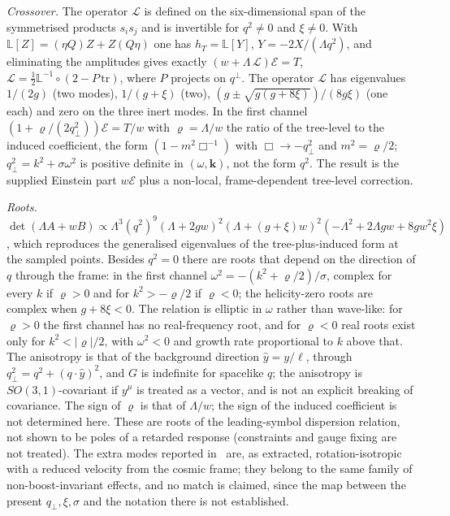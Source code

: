 \emph{Crossover.} The operator \(\mathcal L\) is defined on the six-dimensional span of the symmetrised products \(s_is_j\) and is invertible for \(q^2\neq0\) and \(\xi\neq0\). With \(\mathbb L[Z]=(\eta Q)Z+Z(Q\eta)\) one has \(h_T=\mathbb L[Y]\), \(Y=-2X/(\Lambda q^2)\), and eliminating the amplitudes gives exactly \((w+\Lambda\,\mathcal L)\mathcal E=T\), \(\mathcal L=\tfrac12\mathbb L^{-1}\circ(2-P\,\mathrm{tr})\), where \(P\) projects on \(q^\perp\). The operator \(\mathcal L\) has eigenvalues \(1/(2g)\) (two modes), \(1/(g+\xi)\) (two), \((g\pm\sqrt{g(g+8\xi)})/(8g\xi)\) (one each) and zero on the three inert modes. In the first channel \((1+\varrho/(2q_\perp^2))\mathcal E=T/w\) with \(\varrho=\Lambda/w\) the ratio of the tree-level to the induced coefficient, the form \((1-m^2\Box^{-1})\) with \(\Box\to-q_\perp^2\) and \(m^2=\varrho/2\); \(q_\perp^2=k^2+\sigma\omega^2\) is positive definite in \((\omega,\mathbf k)\), not the form \(q^2\). The result is the supplied Einstein part \(w\mathcal E\) plus a non-local, frame-dependent tree-level correction.

\emph{Roots.} \(\det(\Lambda A+wB)\propto\Lambda^3(q^2)^9(\Lambda+2gw)^2(\Lambda+(g+\xi)w)^2(-\Lambda^2+2\Lambda gw+8gw^2\xi)\), which reproduces the generalised eigenvalues of the tree-plus-induced form at the sampled points. Besides \(q^2=0\) there are roots that depend on the direction of \(q\) through the frame: in the first channel \(\omega^2=-(k^2+\varrho/2)/\sigma\), complex for every \(k\) if \(\varrho>0\) and for \(k^2>-\varrho/2\) if \(\varrho<0\); the helicity-zero roots are complex when \(g+8\xi<0\). The relation is elliptic in \(\omega\) rather than wave-like: for \(\varrho>0\) the first channel has no real-frequency root, and for \(\varrho<0\) real roots exist only for \(k^2<|\varrho|/2\), with \(\omega^2<0\) and growth rate proportional to \(k\) above that. The anisotropy is that of the background direction \(\hat y=y/\ell\), through \(q_\perp^2=q^2+(q\!\cdot\!\hat y)^2\), and \(G\) is indefinite for spacelike \(q\); the anisotropy is \(SO(3,1)\)-covariant if \(y^\mu\) is treated as a vector, and is not an explicit breaking of covariance. The sign of \(\varrho\) is that of \(\Lambda/w\); the sign of the induced coefficient is not determined here. These are roots of the leading-symbol dispersion relation, not shown to be poles of a retarded response (constraints and gauge fixing are not treated). The extra modes reported in~\cite{Steinacker2026} are, as extracted, rotation-isotropic with a reduced velocity from the cosmic frame; they belong to the same family of non-boost-invariant effects, and no match is claimed, since the map between the present \(q_\perp,\xi,\sigma\) and the notation there is not established.

